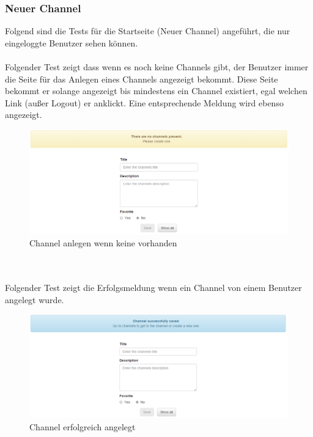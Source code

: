 \documentclass[11pt, a4paper, twoside]{article}   	%
\begin{document}
\subsubsection{Neuer Channel}
Folgend sind die Tests für die Startseite (Neuer Channel) angeführt, die nur eingeloggte Benutzer sehen können.\\\\
Folgender Test zeigt dass wenn es noch keine Channels gibt, der Benutzer immer die Seite für das Anlegen eines Channels angezeigt bekommt. Diese Seite bekommt er solange angezeigt bis mindestens ein Channel existiert, egal welchen Link (außer Logout) er anklickt. Eine entsprechende Meldung wird ebenso angezeigt.
\begin{figure}[h]
	\centering
	\includegraphics[scale=0.5]{images/start_new_channel_no_channels.PNG}
	\caption
	{Channel anlegen wenn keine vorhanden}
\end{figure}\\\\

Folgender Test zeigt die Erfolgsmeldung wenn ein Channel von einem Benutzer angelegt wurde.
\begin{figure}[h]
	\centering
	\includegraphics[scale=0.5]{images/start_new_channel_successful.PNG}
	\caption
	{Channel erfolgreich angelegt}
\end{figure}\\\\
\newpage
\end{document}
